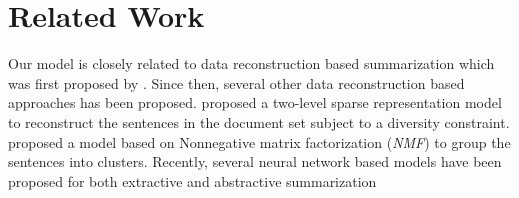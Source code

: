\documentclass[11pt,a4paper]{article}
\begin{document}
\begin{table}[ht]
\caption{\% Average F-measure on DUC 2007} %
\centering 
{}
\end{table}



\section{Related Work}



Our model is closely related to data reconstruction based summarization which was first proposed by  \cite{dsdr}. Since then, several other data reconstruction \cite{spopt,docrebuild} based approaches has been proposed. \cite{mdsparse} proposed a two-level sparse representation model to reconstruct the sentences in the document set subject to a diversity constraint. \cite{nmf} proposed  a model based on Nonnegative matrix factorization (\textit{NMF}) to group the sentences into clusters. Recently, several neural network based models have been proposed for both extractive \cite{attsum,summarunner} and abstractive summarization \cite{namas,abs}
\end{document}
